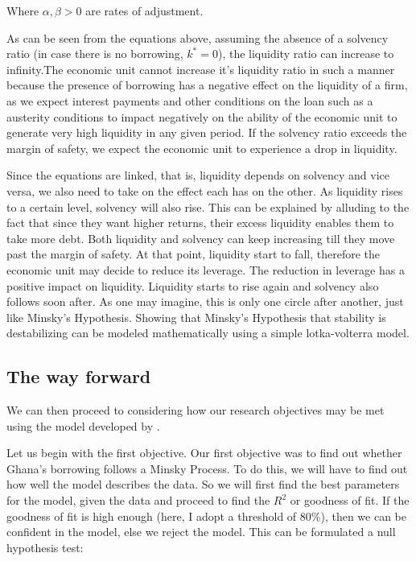 \documentclass[a4paper, 12pt]{article}
\begin{document}
	Where $\alpha, \beta > 0$ are rates of adjustment.
	
	As can be seen from the equations above, assuming the absence of a solvency ratio (in case there is no borrowing, $k^* = 0$), the liquidity ratio can increase to infinity.The economic unit cannot increase it's liquidity ratio in such a manner because the presence of borrowing has a negative effect on the liquidity of a firm, as we expect interest payments and other conditions on the loan such as a austerity conditions to impact negatively on the ability of the economic unit to generate very high liquidity in any given period. If the solvency ratio exceeds the margin of safety, we expect the economic unit to experience a drop in liquidity.
	
	Since the equations are linked, that is, liquidity depends on solvency and vice versa, we also need to take on the effect each has on the other. As liquidity rises to a certain level, solvency will also rise. This can be explained by alluding to the fact that since they want higher returns, their excess liquidity enables them to take more debt. Both liquidity and solvency can keep increasing till they move past the margin of safety. At that point, liquidity start to fall, therefore the economic unit may decide to reduce its leverage. The reduction in leverage has a positive impact on liquidity. Liquidity starts to rise again and solvency also follows soon after. As one may imagine, this is only one circle after another, just like Minsky's Hypothesis. Showing that Minsky's Hypothesis that stability is destabilizing can be modeled mathematically using a simple lotka-volterra model.
	
	\subsection{The way forward}
	We can then proceed to considering how our research objectives may be met using the model developed by .
	
	Let us begin with the first objective. Our first objective was to find out whether Ghana's borrowing follows a Minsky Process. To do this, we will have to find out how well the model describes the data. So we will first find the best parameters for the model, given the data and proceed to find the $R^2$ or goodness of fit. If the goodness of fit is high enough (here, I adopt a threshold of 80\%), then we can be confident in the model, else we reject the model. This can be formulated a null hypothesis test:
	
\end{document}
